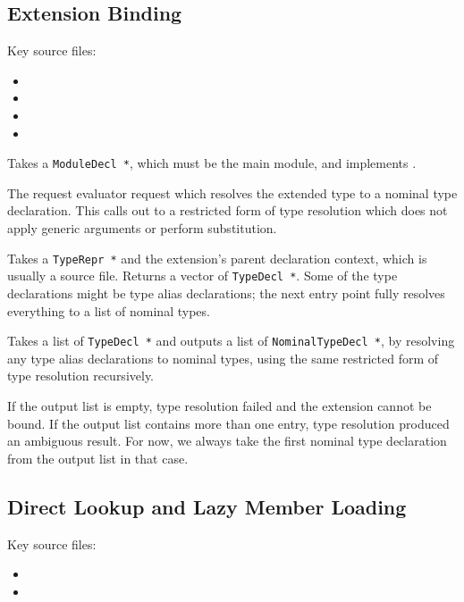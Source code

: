 \documentclass[../generics]{subfiles}
\begin{document}
\subsection*{Extension Binding}

Key source files:
\begin{itemize}
\item {}
\item {}
\item {}
\item {}
\end{itemize}

Takes a \texttt{ModuleDecl *}, which must be the main module, and implements .

The request evaluator request which resolves the extended type to a nominal type declaration. This calls out to a restricted form of type resolution which does not apply generic arguments or perform substitution.

Takes a \texttt{TypeRepr *} and the extension's parent declaration context, which is usually a source file. Returns a vector of \texttt{TypeDecl *}. Some of the type declarations might be type alias declarations; the next entry point fully resolves everything to a list of nominal types.

Takes a list of \texttt{TypeDecl *} and outputs a list of \texttt{NominalTypeDecl *}, by resolving any type alias declarations to nominal types, using the same restricted form of type resolution recursively.

If the output list is empty, type resolution failed and the extension cannot be bound. If the output list contains more than one entry, type resolution produced an ambiguous result. For now, we always take the first nominal type declaration from the output list in that case.

\subsection*{Direct Lookup and Lazy Member Loading}

Key source files:
\begin{itemize}
\item {}
\item {}
\end{itemize}
\end{document}

